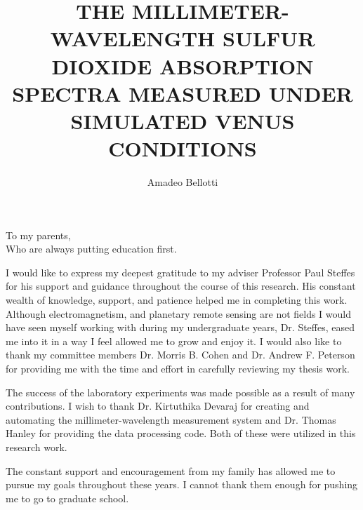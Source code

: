 \documentclass[12pt]{gatech-thesis}
\title{THE MILLIMETER-WAVELENGTH SULFUR DIOXIDE ABSORPTION SPECTRA MEASURED UNDER SIMULATED VENUS CONDITIONS} %
\author{Amadeo Bellotti}
\numberwithin{equation}{chapter}
\numberwithin{figure}{chapter}
\begin{document}

\begin{preliminary}
\begin{dedication}
\null\vfil
{\large
\begin{center}
To my parents,\\\vspace{12pt}
Who are always putting education first.
\end{center}}
\vfil\null
\end{dedication}
\begin{acknowledgements}
I would like to express my deepest gratitude to my adviser Professor Paul Steffes for his support and guidance throughout the course of this research. His constant wealth of knowledge, support, and patience helped me in completing this work. Although electromagnetism, and planetary remote sensing are not fields I would have seen myself working with during my undergraduate years, Dr. Steffes, eased me into it in a way I feel allowed me to grow and enjoy it. I would also like to thank my committee members Dr. Morris B. Cohen and Dr. Andrew F. Peterson for providing me with the time and effort in carefully reviewing my thesis work.

The success of the laboratory experiments was made possible as a result of many contributions. I wish to thank Dr. Kirtuthika Devaraj for creating and automating the millimeter-wavelength measurement system and Dr. Thomas Hanley for providing the data processing code. Both of these were utilized in this research work. 

The constant support and encouragement from my family has allowed me to pursue my goals throughout these years. I cannot thank them enough for pushing me to go to graduate school. 
\end{acknowledgements}
\contents

\end{preliminary}


%

%



\end{document}
